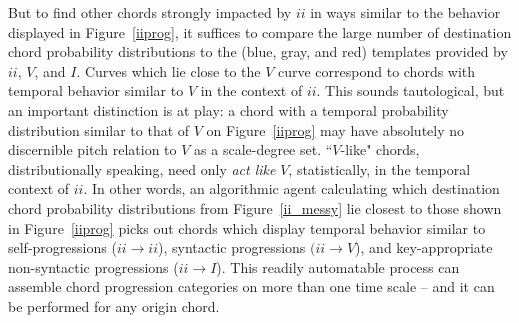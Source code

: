 But to find other chords strongly impacted by $ii$ in ways similar to the behavior displayed in Figure~\ref{iiprog}, it suffices to compare the large number of destination chord probability distributions to the (blue, gray, and red) templates provided by $ii$, $V$, and $I$.  Curves which lie close to the $V$ curve correspond to chords with temporal behavior similar to $V$ in the context of $ii$.  This sounds tautological, but an important distinction is at play: a chord with a temporal probability distribution similar to that of $V$ on Figure~\ref{iiprog} may have absolutely no discernible pitch relation to $V$ as a scale-degree set.  ``$V$-like" chords, distributionally speaking, need only \emph{act like} $V$, statistically, in the temporal context of $ii$.  In other words, an algorithmic agent calculating which destination chord probability distributions from Figure~\ref{ii_messy} lie closest to those shown in Figure~\ref{iiprog} picks out chords which display temporal behavior similar to self-progressions ($ii \rightarrow ii$), syntactic progressions $(ii \rightarrow V$), and key-appropriate non-syntactic progressions ($ii \rightarrow I$).  This readily automatable process can assemble chord progression categories on more than one time scale -- and it can be performed for any origin chord.

